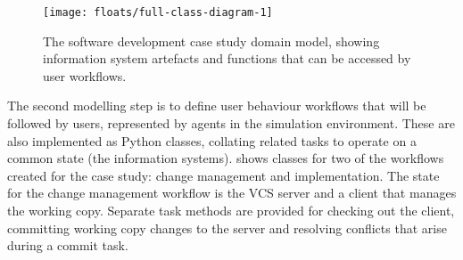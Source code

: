\documentclass{llncs}
\begin{document}
\begin{figure}[t]
  \centering
  \texttt{[image: floats/full-class-diagram-1]}
  \caption{The software development case study domain model, showing information system artefacts and functions that can
    be accessed by user workflows.}
  \label{fig:domain}

\end{figure}

The second modelling step is to define user behaviour workflows that will be followed by users, represented by agents in
the simulation environment. These are also implemented as Python classes, collating related tasks to operate on a common
state (the information systems).  shows classes for two of the workflows created for the case study:
change management and implementation.  The state for the change management workflow is the VCS server and a client that
manages the working copy.  Separate task methods are provided for checking out the client, committing working copy
changes to the server and resolving conflicts that arise during a commit task.
\end{document}
